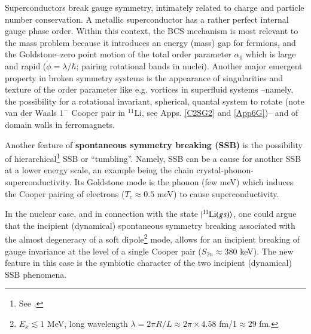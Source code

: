 Superconductors break gauge symmetry, intimately related to charge and particle number conservation. A metallic superconductor has a rather perfect internal gauge phase order. Within this context, the BCS mechanism is most relevant to the mass problem because it introduces an energy (mass) gap for fermions, and the Goldstone--zero point motion of the total order parameter $\alpha_0$ which is large and rapid ($\dot\phi=\lambda/\hbar$; pairing rotational bands in  nuclei). Another major emergent property in broken symmetry systems is the appearance of singularities and texture of the order parameter like e.g. vortices in superfluid systems --namely, the possibility for a rotational invariant, spherical, quantal system to rotate (note van der Waals $1^-$ Cooper pair in $^{11}$Li, see Apps. \ref{C2SG2} and \ref{App6G})-- and of domain walls in ferromagnets.


Another feature of \textbf{spontaneous symmetry breaking (SSB)} is the possibility of hierarchical\footnote{See \cite{Nambu:91}.} SSB or ``tumbling''. Namely, SSB can be a cause for another SSB at a lower energy scale, an example being the chain crystal-phonon-superconductivity. Its Goldstone mode is the phonon (few meV) which induces the Cooper pairing of electrons ($T_c\approx0.5$ meV) to cause superconductivity.

In the nuclear case, and in connection with the state $|{^{11}\text{Li}(gs)} \rangle $, one could argue that the incipient (dynamical) spontaneous symmetry breaking associated with the almost degeneracy of a soft dipole\footnote{$E_x\lesssim1$ MeV, long wavelength $\lambda=2\pi R/L\approx 2\pi\times 4.58$ fm/1$\approx 29$ fm.} mode, allows for an incipient breaking of gauge invariance at the level of a single Cooper pair ($S_{2n}\approx380$ keV). The new feature in this case is the symbiotic character of the two incipient (dynamical) SSB phenomena.
